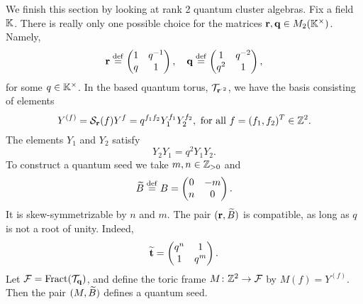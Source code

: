 We finish this section by looking at rank 2 quantum cluster algebras. Fix a field
$\mathbb{K}$. There is really only one possible choice for the matrices $\mathbf{r}, \mathbf{q} \in
	M_2(\mathbb{K}^\times)$. Namely,
\begin{equation*}
	\mathbf{r} \overset{\mathrm{def}}{=} \begin{pmatrix}
		1 & q^{-1} \\
		q & 1
	\end{pmatrix}, \quad
	\mathbf{q} \overset{\mathrm{def}}{=} \begin{pmatrix}
		1   & q^{-2} \\
		q^2 & 1
	\end{pmatrix},
\end{equation*}
%
for some $q \in \mathbb{K}^\times$. In the based quantum torus, $\mathcal{T}_{\mathbf{r}^{\cdot 2}}$, we
have the basis consisting of elements
\begin{equation*}
	Y^{(f)} = \mathcal{S}_{\mathbf{r}}(f)Y^f = q^{f_1f_2}Y_1^{f_1}Y_2^{f_2}, \text{ for all } f = (f_1, f_2)^T \in \mathbb{Z}^2.
\end{equation*}
%
The elements $Y_1$ and $Y_2$ satisfy
\begin{equation*}
	Y_2 Y_1 = q^2 Y_1 Y_2.
\end{equation*}
To construct a quantum seed we take $m,n \in \mathbb{Z}_{> 0}$ and
\begin{equation*}
	\widetilde{B} \overset{\mathrm{def}}{=} B = \begin{pmatrix}
		0 & -m \\
		n & 0
	\end{pmatrix}.
\end{equation*}
%
It is skew-symmetrizable by $n$ and $m$. The pair $(\mathbf{r}, \widetilde{B})$ is compatible, as long
as $q$ is not a root of unity. Indeed,
\begin{equation*}
	\widetilde{\mathbf{t}} = \begin{pmatrix}
		q^n & 1   \\
		1   & q^m
	\end{pmatrix}.
\end{equation*}
%
Let $\mathcal{F} = \operatorname{Fract}(\mathcal{T}_{\mathbf{q}})$, and define the toric frame $M \colon \mathbb{Z}^2 \to \mathcal{F}$
by $M(f) = Y^{(f)}$. Then the pair $(M, \widetilde{B})$ defines a quantum seed.

